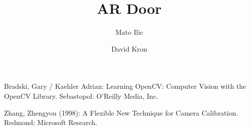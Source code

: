 \documentclass{llncs}
\begin{document}
%
\pagestyle{headings}  %
%
\title{AR Door}
%
%
\author{Mato Ilic \and David Kron}
%
%
%

\maketitle              %

\tableofcontents
\newpage


\newpage




\newpage

%
%
%
\newpage
\begin{thebibliography}{5}

Bradski, Gary / Kaehler Adrian:
Learning OpenCV: Computer Vision with the OpenCV Library.
Sebastopol: O'Reilly Media, Inc.

Zhang, Zhengyou (1998): A Flexible New Technique for Camera Calibration. 
Redmond: Microsoft Research.

\end{thebibliography}
\end{document}
